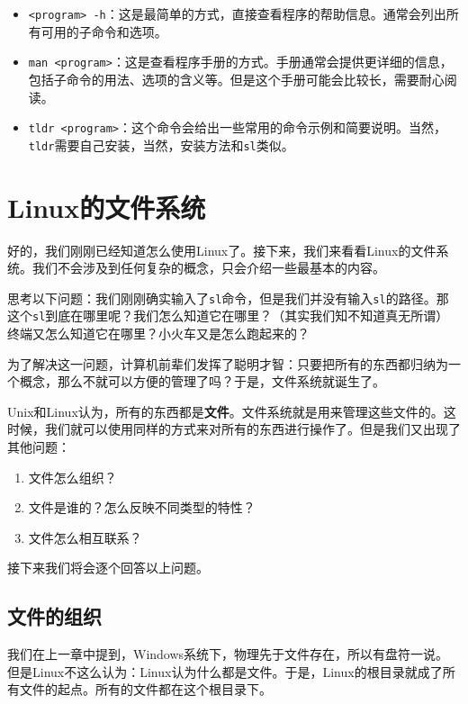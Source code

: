 \documentclass[../main.tex]{subfiles}
\begin{document}
\begin{itemize}
  \item \texttt{<program> -h}：这是最简单的方式，直接查看程序的帮助信息。通常会列出所有可用的子命令和选项。
  \item \texttt{man <program>}：这是查看程序手册的方式。手册通常会提供更详细的信息，包括子命令的用法、选项的含义等。但是这个手册可能会比较长，需要耐心阅读。
  \item \texttt{tldr <program>}：这个命令会给出一些常用的命令示例和简要说明。当然，\texttt{tldr}需要自己安装，当然，安装方法和\texttt{sl}类似。
\end{itemize}

\section{Linux的文件系统}

好的，我们刚刚已经知道怎么使用Linux了。接下来，我们来看看Linux的文件系统。我们不会涉及到任何复杂的概念，只会介绍一些最基本的内容。

思考以下问题：我们刚刚确实输入了\texttt{sl}命令，但是我们并没有输入\texttt{sl}的路径。那这个\texttt{sl}到底在哪里呢？我们怎么知道它在哪里？（其实我们知不知道真无所谓）终端又怎么知道它在哪里？小火车又是怎么跑起来的？

为了解决这一问题，计算机前辈们发挥了聪明才智：只要把所有的东西都归纳为一个概念，那么不就可以方便的管理了吗？于是，文件系统就诞生了。

Unix和Linux认为，所有的东西都是\textbf{文件}。文件系统就是用来管理这些文件的。这时候，我们就可以使用同样的方式来对所有的东西进行操作了。但是我们又出现了其他问题：

\begin{enumerate}
  \item 文件怎么组织？
  \item 文件是谁的？怎么反映不同类型的特性？
  \item 文件怎么相互联系？
\end{enumerate}

接下来我们将会逐个回答以上问题。

\subsection{文件的组织}

我们在上一章中提到，Windows系统下，物理先于文件存在，所以有盘符一说。但是Linux不这么认为：Linux认为什么都是文件。于是，Linux的根目录\text{/}就成了所有文件的起点。所有的文件都在这个根目录下。
\end{document}

